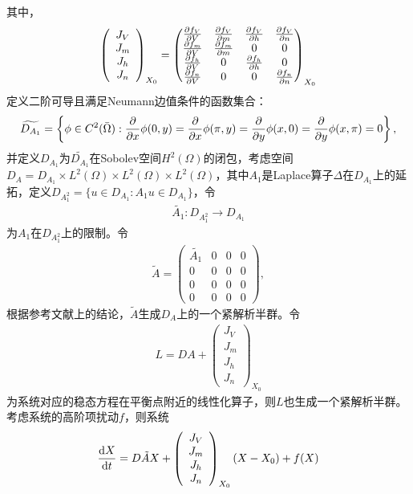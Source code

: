\documentclass[
bachelor,
nofont, %
pdflinks,
]{xjtuthesis}
\begin{document}
其中，
\begin{align}
\left(
\begin{array}{c}
J_V\\
J_m\\
J_h\\
J_n
\end{array}
\right)_{X_0}=
\left(
\begin{matrix} 
\frac{\partial f_V}{\partial V} & \frac{\partial f_V}{\partial m} & \frac{\partial f_V}{\partial h} & \frac{\partial f_V}{\partial n}\\ 
\frac{\partial f_m}{\partial V} & \frac{\partial f_m}{\partial m} & 0 & 0\\ 
\frac{\partial f_h}{\partial V} & 0 & \frac{\partial f_h}{\partial h} & 0 \\
\frac{\partial f_n}{\partial V} & 0 & 0 & \frac{\partial f_n}{\partial n}
\end{matrix}
\right) _{X_0}
\end{align}
定义二阶可导且满足Neumann边值条件的函数集合：
\begin{align*}
\widetilde{D_{A_1}} = \left\{ \phi\in C^2(\bar{\Omega}):
\frac{\partial }{\partial x} \phi(0,y) = \frac{\partial }{\partial x} \phi(\pi,y) =
\frac{\partial }{\partial y} \phi(x,0) = \frac{\partial }{\partial y} \phi(x,\pi) = 0 \right\},
\end{align*}
并定义$D_{A_1}$为$\widetilde{D_{A_1}}$在Sobolev空间$H^2(\Omega)$的闭包，考虑空间$D_A=D_{A_1}\times L^2(\Omega) \times L^2(\Omega) \times L^2(\Omega)$，其中$A_1$是Laplace算子$\Delta$在$D_{A_1}$上的延拓，定义$D_{A_1^2}=\{u \in D_{A_1}:A _1 u\in D_{A_1}\}$，令
\begin{align*}
\tilde{A_1}:D_{A_1^2} \rightarrow D_{A_1}
\end{align*}
为$A_1$在$D_{A_1^2}$上的限制。令
\begin{align*}
\tilde{A}=\left(
\begin{array}{cccc}
\tilde{A_1} &0 & 0 &0\\
0&0 & 0 &0\\
0 &0 & 0 &0\\
0 &0 & 0 &0
\end{array}
\right),
\end{align*}
根据参考文献\cite{hassard1981theory}上的结论，$\tilde{A}$生成$D_A$上的一个紧解析半群。令
\begin{align*}
L=DA+\left(
\begin{array}{c}
J_V\\
J_m\\
J_h\\
J_n
\end{array}
\right)_{X_0}
\end{align*}
为系统对应的稳态方程在平衡点附近的线性化算子，则$L$也生成一个紧解析半群。考虑系统的高阶项扰动$f$，则系统
\begin{align}
\frac{\mathrm d X}{\mathrm d t}=D\tilde{A}X + \left(
\begin{array}{c}
J_V\\
J_m\\
J_h\\
J_n
\end{array}
\right)_{X_0} (X - X _0) +f(X)
\end{align}
\end{document}
